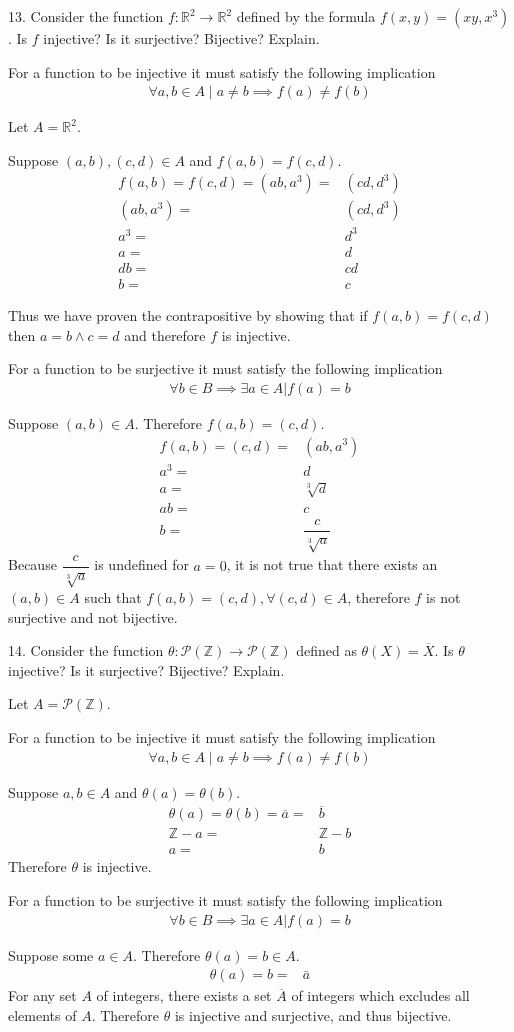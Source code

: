 \documentclass{idrisMemo}
\newcommand{\inj}{
\item For a function to be injective it must satisfy the following implication
\begin{align*}
    \forall a,b \in A\mid a\neq b\implies f(a)\neq f(b)
\end{align*}
}
\newcommand{\surj}{
\item For a function to be surjective it must satisfy the following implication
\begin{align*}
    \forall b \in B \implies \exists a \in A | f(a) = b
\end{align*}
}
\begin{document}
\begin{prooflist}{13. Consider the function $f: \mathbb{R}^2 \rightarrow
    \mathbb{R}^2$ defined by the formula $f(x, y)=\left(x y, x^3\right)$. Is $f$
injective? Is it surjective? Bijective? Explain.}
\inj{}
\item Let $A=\mathbb{R}^2$.
\item Suppose $(a, b), (c, d) \in A$ and $f(a, b)=f(c, d)$.
\begin{align*}
    f(a, b)=f(c, d)=(ab, a^3) =& (cd, d^3)\\
    (ab, a^3) =& (cd, d^3)\\
    a^3=& d^3\\
    a=& d\\
    db=& cd\\
    b=& c
\end{align*}
\item Thus we have proven the contrapositive by showing that if $f(a, b)=f(c,
    d)$ then $a=b \land c=d$ and therefore $f$ is injective.
\surj{}
\item Suppose $(a, b)\in A$. Therefore $f(a, b)=(c, d)$.
\begin{align*}
    f(a, b)=(c,d)=&(ab, a^3)\\
    a^3=&d\\
    a=&\sqrt[3]{d}\\
    ab=&c\\
    b=&\dfrac{c}{\sqrt[3]{a}}
\end{align*}
Because $\dfrac{c}{\sqrt[3]{a}}$ is undefined for $a=0$, it is not true that
there exists an $(a, b)\in A$ such that $f(a, b)=(c, d), \forall (c, d) \in A$,
therefore $f$ is not surjective and not bijective.
\end{prooflist}

\begin{prooflist}{14. Consider the function $\theta: \mathscr{P}(\mathbb{Z})
    \rightarrow \mathscr{P}(\mathbb{Z})$ defined as $\theta(X)=\overline{X}$. Is
$\theta$ injective? Is it surjective? Bijective? Explain.}
\item Let $A=\mathscr{P}(\mathbb{Z})$.
\inj{}
\item Suppose $a, b \in A$ and $\theta(a)=\theta(b)$.
\begin{align*}
    \theta(a)=\theta(b)=\overline{a} =& \overline{b}\\
    \mathbb{Z} - a =& \mathbb{Z} -b \\
    a =& b
\end{align*}
Therefore $\theta$ is injective.
\surj{}
\item Suppose some $a\in A$. Therefore $\theta(a)=b\in A$.
\begin{align*}
    \theta(a)=b=&\bar{a}
\end{align*}
For any set $A$ of integers, there exists a set $\overline{A}$ of integers which excludes all
elements of $A$. Therefore $\theta$ is injective and surjective, and thus
bijective.
\end{prooflist}
\end{document}
